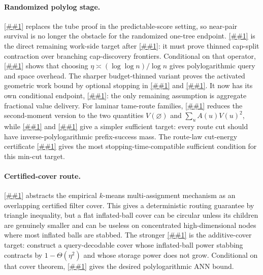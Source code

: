 \documentclass[10pt]{article}
\newcommand{\cref}[1]{\ref{##1}}
\newcommand{\Cref}[1]{\ref{##1}}
\theoremstyle{definition}
\begin{document}
\paragraph{Randomized polylog stage.}
\Cref{lem:adaptive-continuation} replaces the tube proof in the predictable-score setting, so near-pair survival is no longer the obstacle for the randomized one-tree endpoint. \Cref{asm:mixed-continuation-operator} is the direct remaining work-side target after \cref{lem:cap-free-scan-accounting}: it must prove thinned cap-split contraction over branching cap-discovery frontiers. Conditional on that operator, \cref{prop:randomized-polylog} shows that choosing $\eta\asymp(\log\log n)/\log n$ gives polylogarithmic query and space overhead. The sharper budget-thinned variant proves the activated geometric work bound by optional stopping in \cref{lem:canonical-mixed-budget} and \cref{lem:budget-thinned-opportunities}. It now has its own conditional endpoint, \cref{prop:budget-thinned-polylog}: the only remaining assumption is aggregate fractional value delivery. For laminar tame-route families, \cref{lem:lca-value-flow} reduces the second-moment version to the two quantities $V(\varnothing)$ and $\sum_uA(u)V(u)^2$, while \cref{lem:saturated-value-recursion} and \cref{lem:saturated-value-mincut} give a simpler sufficient target: every route cut should have inverse-polylogarithmic prefix-success mass. The route-law cut-energy certificate \cref{lem:cut-energy-route-law} gives the most stopping-time-compatible sufficient condition for this min-cut target.

\paragraph{Certified-cover route.}
\Cref{lem:certified-cover-compiler} abstracts the empirical $k$-means
multi-assignment mechanism as an overlapping certified filter cover. This gives
a deterministic routing guarantee by triangle inequality, but a flat
inflated-ball cover can be circular unless its children are genuinely smaller
and can be useless on concentrated high-dimensional nodes where most inflated
balls are stabbed. The stronger \cref{asm:power-cover} is the additive-cover
target: construct a query-decodable cover whose inflated-ball power stabbing
contracts by $1-\Theta(\eta^2)$ and whose storage power does not grow.
Conditional on that cover theorem, \cref{prop:power-cover-polylog} gives the
desired polylogarithmic ANN bound.
\end{document}
